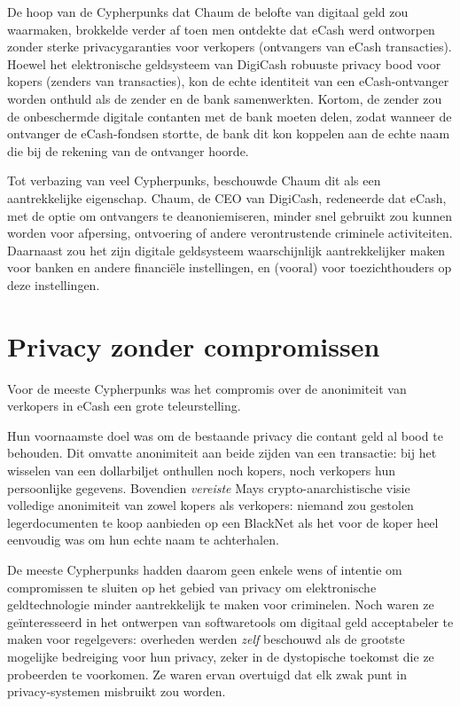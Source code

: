 \documentclass[
  a5paper,
  smalldemyvopaper,11pt,twoside,onecolumn,openright,extrafontsizes,
hidelinks]{memoir}
\begin{document}
De hoop van de Cypherpunks dat Chaum de belofte van digitaal geld zou
waarmaken, brokkelde verder af toen men ontdekte dat eCash werd
ontworpen zonder sterke privacygaranties voor verkopers (ontvangers van
eCash transacties). Hoewel het elektronische geldsysteem van DigiCash
robuuste privacy bood voor kopers (zenders van transacties), kon de
echte identiteit van een eCash-ontvanger worden onthuld als de zender en
de bank samenwerkten. Kortom, de zender zou de onbeschermde digitale
contanten met de bank moeten delen, zodat wanneer de ontvanger de
eCash-fondsen stortte, de bank dit kon koppelen aan de echte naam die
bij de rekening van de ontvanger hoorde.

Tot verbazing van veel Cypherpunks, beschouwde Chaum dit als een
aantrekkelijke eigenschap. Chaum, de CEO van DigiCash, redeneerde dat
eCash, met de optie om ontvangers te deanoniemiseren, minder snel
gebruikt zou kunnen worden voor afpersing, ontvoering of andere
verontrustende criminele activiteiten. Daarnaast zou het zijn digitale
geldsysteem waarschijnlijk aantrekkelijker maken voor banken en andere
financiële instellingen, en (vooral) voor toezichthouders op deze
instellingen.

\section{Privacy zonder compromissen}\label{privacy-zonder-compromissen}

Voor de meeste Cypherpunks was het compromis over de anonimiteit van
verkopers in eCash een grote teleurstelling.

Hun voornaamste doel was om de bestaande privacy die contant geld al
bood te behouden. Dit omvatte anonimiteit aan beide zijden van een
transactie: bij het wisselen van een dollarbiljet onthullen noch kopers,
noch verkopers hun persoonlijke gegevens. Bovendien \emph{vereiste} Mays
crypto-anarchistische visie volledige anonimiteit van zowel kopers als
verkopers: niemand zou gestolen legerdocumenten te koop aanbieden op een
BlackNet als het voor de koper heel eenvoudig was om hun echte naam te
achterhalen.

De meeste Cypherpunks hadden daarom geen enkele wens of intentie om
compromissen te sluiten op het gebied van privacy om elektronische
geldtechnologie minder aantrekkelijk te maken voor criminelen. Noch
waren ze geïnteresseerd in het ontwerpen van softwaretools om digitaal
geld acceptabeler te maken voor regelgevers: overheden werden
\emph{zelf} beschouwd als de grootste mogelijke bedreiging voor hun
privacy, zeker in de dystopische toekomst die ze probeerden te
voorkomen. Ze waren ervan overtuigd dat elk zwak punt in
privacy-systemen misbruikt zou worden.
\end{document}
